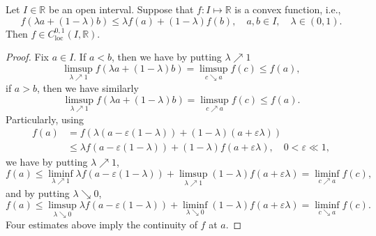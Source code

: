 \begin{proposition}
	Let $I\in\mathbb{R}$ be an open interval. Suppose that $f: I\mapsto\mathbb{R}$ is a convex function,
	i.e.,
	\[
		f(\lambda a + (1-\lambda)b) \leq \lambda f(a) + (1-\lambda)f(b),\quad a,b\in I, \quad \lambda\in(0,1).
	\]
	Then $f\in C^{0,1}_{\mathrm{loc}}(I,\mathbb R)$.
\end{proposition}

\begin{proof}
	Fix $a\in I$.
	If $a<b$, then we have by putting $\lambda\nearrow1$
	\[
		\limsup_{\lambda\nearrow1}f(\lambda a + (1-\lambda)b) = \limsup_{c\searrow a}f(c)\leq f(a),
	\]
	if $a>b$, then we have similarly
	\[
		\limsup_{\lambda\nearrow1}f(\lambda a + (1-\lambda)b) = \limsup_{c\nearrow a}f(c)\leq f(a).
	\]
	Particularly, using
	\begin{align*}
		f(a) &= f(\lambda(a-\varepsilon(1-\lambda)) + (1-\lambda)(a+\varepsilon\lambda))\\
			&\leq \lambda f(a-\varepsilon(1-\lambda)) + (1-\lambda)f(a+\varepsilon\lambda),
			\quad 0<\varepsilon\ll 1,
	\end{align*}
	we have by putting $\lambda\nearrow1$,
	\[
		f(a)\leq \liminf_{\lambda\nearrow1}\lambda f(a-\varepsilon(1-\lambda)) 
			+ \limsup_{\lambda\nearrow1}(1-\lambda)f(a+\varepsilon\lambda)
			= \liminf_{c\nearrow a}f(c),
	\]
	and by putting $\lambda\searrow0$,
	\[
		f(a)\leq \limsup_{\lambda\searrow0}\lambda f(a-\varepsilon(1-\lambda)) 
			+ \liminf_{\lambda\searrow0}(1-\lambda)f(a+\varepsilon\lambda)
			= \liminf_{c\searrow a}f(c).
	\]	
	Four estimates above imply the continuity of $f$ at $a$.


\end{proof}
